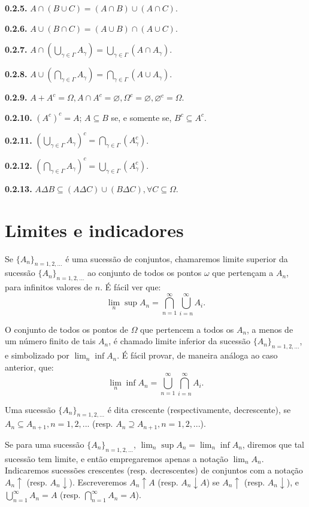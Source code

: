 \documentclass[
]{book}
\begin{document}
\textbf{0.2.5.} \(A \cap (B \cup C) = (A \cap B) \cup (A \cap C)\).

\textbf{0.2.6.} \(A \cup (B \cap C) = (A \cup B) \cap (A \cup C)\).

\textbf{0.2.7.} \(A \cap (\bigcup\limits_{\gamma \in \Gamma} A_{\gamma}) = \bigcup\limits_{\gamma \in \Gamma} (A \cap A_{\gamma})\).

\textbf{0.2.8.} \(A \cup (\bigcap\limits_{\gamma \in \Gamma} A_{\gamma}) = \bigcap\limits_{\gamma \in \Gamma} (A \cup A_{\gamma})\).

\textbf{0.2.9.} \(A + A^c = \Omega, A \cap A^c = \varnothing, \Omega^c = \varnothing, \varnothing^c = \Omega\).

\textbf{0.2.10.} \((A^c)^c = A\); \(A \subseteq B\) se, e somente se, \(B^c \subseteq A^c\).

\textbf{0.2.11.} \((\bigcup\limits_{\gamma \in \Gamma} A_{\gamma})^c = \bigcap\limits_{\gamma \in \Gamma} (A_{\gamma}^c)\).

\textbf{0.2.12.} \((\bigcap\limits_{\gamma \in \Gamma} A_{\gamma})^c = \bigcup\limits_{\gamma \in \Gamma} (A_{\gamma}^c)\).

\textbf{0.2.13.} \(A \Delta B \subseteq (A \Delta C) \cup (B \Delta C), \forall C \subseteq \Omega\).

\section{Limites e indicadores}\label{cap03}

Se \(\{A_n\}_{n=1,2,...}\) é uma sucessão de conjuntos, chamaremos limite superior da sucessão \(\{A_n\}_{n=1,2,...}\) ao conjunto de todos os pontos \(\omega\) que pertençam a \(A_n\), para infinitos valores de \(n\).
É fácil ver que: \[ \lim_n \sup A_n = \bigcap_{n=1}^{\infty} \bigcup_{i=n}^{\infty} A_i. \]

O conjunto de todos os pontos de \(\Omega\) que pertencem a todos os \(A_n\), a menos de um número finito de tais \(A_n\), é chamado limite inferior da sucessão \(\{A_n\}_{n=1,2,...}\), e simbolizado por \(\lim_n \inf A_n\).
É fácil provar, de maneira análoga ao caso anterior, que: \[ \lim_n \inf A_n = \bigcup_{n=1}^{\infty} \bigcap_{i=n}^{\infty} A_i. \]

Uma sucessão \(\{A_n\}_{n=1,2,...}\) é dita crescente (respectivamente, decrescente), se \(A_n \subseteq A_{n+1}, n=1, 2, ...\) (resp. \(A_n \supseteq A_{n+1}, n=1, 2, ...\)).

Se para uma sucessão \(\{A_n\}_{n=1,2,...}\), \(\lim_n \sup A_n = \lim_n \inf A_n\), diremos que tal sucessão tem limite, e então empregaremos apenas a notação \(\lim_n A_n\).
Indicaremos sucessões crescentes (resp. decrescentes) de conjuntos com a notação \(A_n \uparrow\) (resp. \(A_n \downarrow\)).
Escreveremos \(A_n \uparrow A\) (resp. \(A_n \downarrow A\)) se \(A_n \uparrow\) (resp. \(A_n \downarrow\)), e \(\bigcup\limits_{n=1}^{\infty} A_n = A\) (resp. \(\bigcap\limits_{n=1}^{\infty} A_n = A\)).
\end{document}
